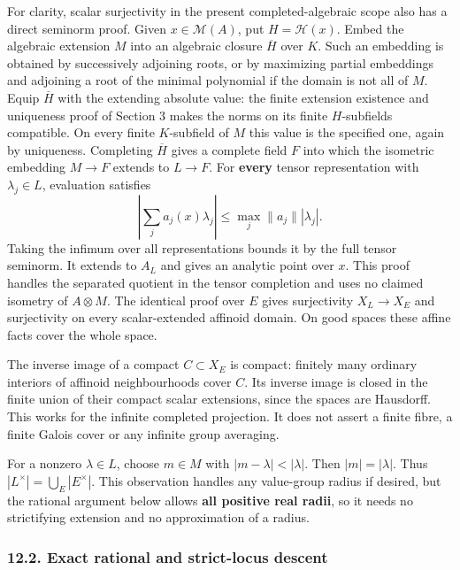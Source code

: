 \documentclass[
  11pt,
]{article}
\begin{document}
For clarity, scalar surjectivity in the present completed-algebraic
scope also has a direct seminorm proof. Given \(x\in\mathcal M(A)\), put
\(H=\mathcal H(x)\). Embed the algebraic extension \(M\) into an
algebraic closure \(\overline H\) over \(K\). Such an embedding is
obtained by successively adjoining roots, or by maximizing partial
embeddings and adjoining a root of the minimal polynomial if the domain
is not all of \(M\). Equip \(\overline H\) with the extending absolute
value: the finite extension existence and uniqueness proof of Section 3
makes the norms on its finite \(H\)-subfields compatible. On every
finite \(K\)-subfield of \(M\) this value is the specified one, again by
uniqueness. Completing \(\overline H\) gives a complete field \(F\) into
which the isometric embedding \(M\to F\) extends to \(L\to F\). For
\textbf{every} tensor representation with \(\lambda_j\in L\), evaluation
satisfies \[
 \left|\sum_j a_j(x)\lambda_j\right|
       \le \max_j\|a_j\||\lambda_j|.
                                                               \tag{31}
\] Taking the infimum over all representations bounds it by the full
tensor seminorm. It extends to \(A_L\) and gives an analytic point over
\(x\). This proof handles the separated quotient in the tensor
completion and uses no claimed isometry of \(A\otimes M\). The identical
proof over \(E\) gives surjectivity \(X_L\to X_E\) and surjectivity on
every scalar-extended affinoid domain. On good spaces these affine facts
cover the whole space.

The inverse image of a compact \(C\subset X_E\) is compact: finitely
many ordinary interiors of affinoid neighbourhoods cover \(C\). Its
inverse image is closed in the finite union of their compact scalar
extensions, since the spaces are Hausdorff. This works for the infinite
completed projection. It does not assert a finite fibre, a finite Galois
cover or any infinite group averaging.

For a nonzero \(\lambda\in L\), choose \(m\in M\) with
\(|m-\lambda|<|\lambda|\). Then \(|m|=|\lambda|\). Thus
\(|L^\times|=\bigcup_E|E^\times|\). This observation handles any
value-group radius if desired, but the rational argument below allows
\textbf{all positive real radii}, so it needs no strictifying extension
and no approximation of a radius.

\subsubsection{12.2. Exact rational and strict-locus
descent}\label{exact-rational-and-strict-locus-descent}
\end{document}
